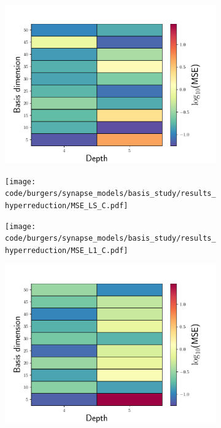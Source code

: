 \documentclass[3p,computermodern,10pt]{elsarticle}
\begin{document}
\begin{figure}
\begin{center}
\begin{subfigure}[t]{0.24\textwidth}
\includegraphics[trim={0cm 0cm 0cm 0cm},clip,width=1.0\linewidth]{code/burgers/synapse_models/basis_study/results_hyperreduction/MSE_LS.pdf}
\caption{\PSTLSROMGNAT}
\label{fig:burg_hyperrom_results1}
\end{subfigure}
\begin{subfigure}[t]{0.24\textwidth}
\texttt{[image: code/burgers/synapse\_models/basis\_study/results\_hyperreduction/MSE\_LS\_C.pdf]}
\caption{\PSTLSROMCOLLOC}
\label{fig:burg_hyperrom_results2}
\end{subfigure}
\begin{subfigure}[t]{0.24\textwidth}
\texttt{[image: code/burgers/synapse\_models/basis\_study/results\_hyperreduction/MSE\_L1\_C.pdf]}
\caption{\PSTLONEROMCOLLOC}
\label{fig:burg_hyperrom_results13}
\end{subfigure}
\begin{subfigure}[t]{0.24\textwidth}
\includegraphics[trim={0cm 0cm 0cm 0cm},clip,width=1.0\linewidth]{code/burgers/synapse_models/basis_study/results_hyperreduction/MSE_ML.pdf}

\end{subfigure}
\end{center}
\end{figure}
\end{document}
